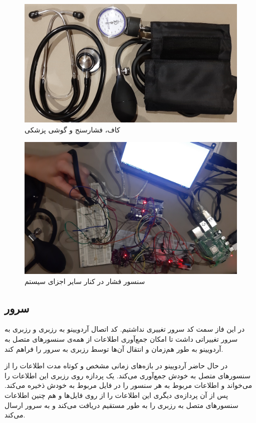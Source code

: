 \documentclass[12pt]{article}
\begin{document}
\begin{figure}[H]
	\begin{center}
		\includegraphics[width=.80\textwidth]{images/cuff-2.jpg}
	\end{center}
	\caption{کاف، فشارسنج و گوشی پزشکی}
\end{figure}

\begin{figure}[H]
	\begin{center}
		\includegraphics[width=.80\textwidth]{images/sensors-pressure-3.jpg}
	\end{center}
	\caption{سنسور فشار در کنار سایر اجزای سیستم}
\end{figure}



\subsection{سرور}

در این فاز سمت کد سرور تغییری نداشتیم. کد اتصال آردویینو به رزبری و رزبری به سرور تغییراتی داشت تا امکان جمع‌آوری اطلاعات از همه‌ی سنسورهای متصل به آردویینو به طور هم‌زمان و انتقال آن‌ها توسط رزبری به سرور را فراهم کند.

در حال حاضر آردویینو در بازه‌ها‌ی زمانی مشخص و کوتاه مدت اطلاعات را از سنسورهای متصل به خودش جمع‌آوری می‌کند. یک پردازه روی رزبری این اطلاعات را می‌خواند و اطلاعات مربوط به هر سنسور را در فایل مربوط به خودش ذخیره می‌کند. پس از آن پردازه‌ی دیگری این اطلاعات را از روی فایل‌ها و هم چنین اطلاعات سنسورهای متصل به رزبری را به طور مستقیم دریافت می‌کند و به سرور ارسال می‌کند.
\end{document}
